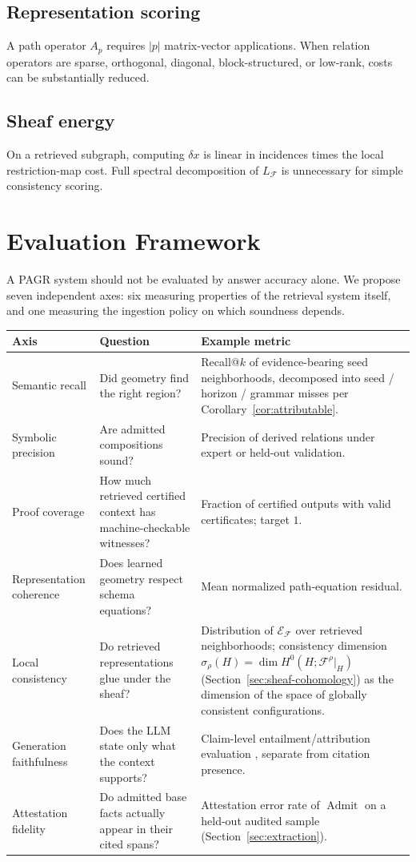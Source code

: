 \documentclass[11pt]{article}
\newcommand{\Energy}{\mathcal{E}}
\newcommand{\F}{\mathcal{F}}
\begin{document}
\subsection{Representation scoring}
A path operator $A_p$ requires $|p|$ matrix-vector applications. When relation operators are sparse, orthogonal, diagonal, block-structured, or low-rank, costs can be substantially reduced.

\subsection{Sheaf energy}
On a retrieved subgraph, computing $\delta x$ is linear in incidences times the local restriction-map cost. Full spectral decomposition of $L_{\F}$ is unnecessary for simple consistency scoring.

\section{Evaluation Framework}
\label{sec:evaluation}

A PAGR system should not be evaluated by answer accuracy alone. We propose seven independent axes: six measuring properties of the retrieval system itself, and one measuring the ingestion policy on which soundness depends.

\begin{longtable}{p{}p{}p{}}
\toprule
Axis & Question & Example metric \\
\midrule
\endhead
Semantic recall & Did geometry find the right region? & Recall@$k$ of evidence-bearing seed neighborhoods, decomposed into seed / horizon / grammar misses per Corollary~\ref{cor:attributable}. \\
Symbolic precision & Are admitted compositions sound? & Precision of derived relations under expert or held-out validation. \\
Proof coverage & How much retrieved certified context has machine-checkable witnesses? & Fraction of certified outputs with valid certificates; target $1$. \\
Representation coherence & Does learned geometry respect schema equations? & Mean normalized path-equation residual. \\
Local consistency & Do retrieved representations glue under the sheaf? & Distribution of $\Energy_{\F}$ over retrieved neighborhoods; consistency dimension $\sigma_\rho(H)=\dim H^0(H;\F^{\rho}|_H)$ (Section~\ref{sec:sheaf-cohomology}) as the dimension of the space of globally consistent configurations. \\
Generation faithfulness & Does the LLM state only what the context supports? & Claim-level entailment/attribution evaluation \citep{gao2023}, separate from citation presence. \\
Attestation fidelity & Do admitted base facts actually appear in their cited spans? & Attestation error rate of $\operatorname{Admit}$ on a held-out audited sample (Section~\ref{sec:extraction}). \\
\bottomrule
\end{longtable}
\end{document}
